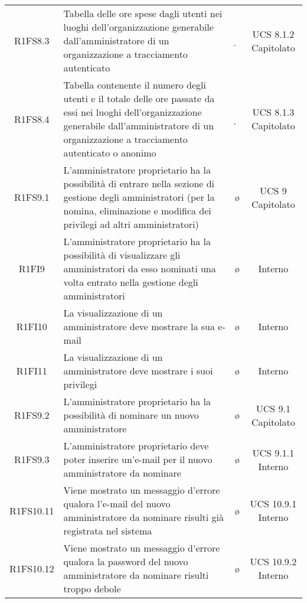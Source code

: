 {\begin{longtable}{ c C{8cm} c c}
R1FS8.3 & Tabella delle ore spese dagli utenti nei luoghi dell'organizzazione generabile dall'amministratore di un organizzazione a tracciamento autenticato & \d & UCS 8.1.2 Capitolato\\

R1FS8.4 & Tabella contenente il numero degli utenti e il totale delle ore passate da essi nei luoghi dell'organizzazione generabile dall'amministratore di un organizzazione a tracciamento autenticato o anonimo & \d & UCS 8.1.3 Capitolato\\




R1FS9.1 & L'amministratore proprietario ha la possibilità di entrare nella sezione di gestione degli amministratori (per la nomina, eliminazione e modifica dei privilegi ad altri amministratori) & \o & UCS 9 Capitolato \\

R1FI9 & L'amministratore proprietario ha la possibilità di visualizzare gli amministratori da esso nominati una volta entrato nella gestione degli amministratori & \o & Interno \\

R1FI10 & La visualizzazione di un amministratore deve mostrare la sua e-mail & \o & Interno \\

R1FI11 & La visualizzazione di un amministratore deve mostrare i suoi privilegi & \o & Interno \\

R1FS9.2 & L'amministratore proprietario ha la possibilità di nominare un nuovo amministratore & \o & UCS 9.1 Capitolato\\

R1FS9.3 & L'amministratore proprietario deve poter inserire un'e-mail per il nuovo amministratore da nominare & \o & UCS 9.1.1 Interno\\

R1FS10.11 & Viene mostrato un messaggio d'errore qualora l'e-mail del nuovo amministratore da nominare risulti già registrata nel sistema & \o & UCS 10.9.1 Interno\\

R1FS10.12 & Viene mostrato un messaggio d'errore qualora la password del nuovo amministratore da nominare risulti troppo debole & \o & UCS 10.9.2 Interno\\


\end{longtable}}

